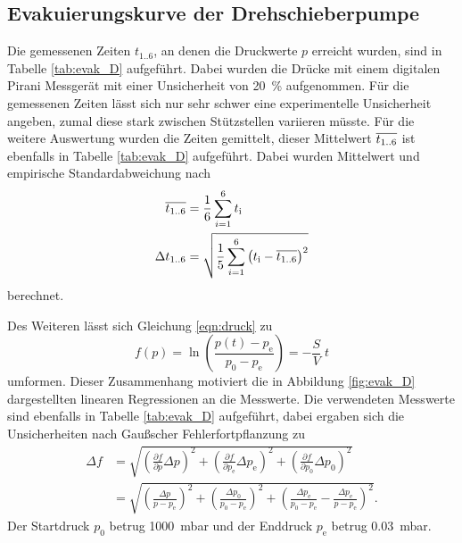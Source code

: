 \subsection{Evakuierungskurve der Drehschieberpumpe}
\label{sec:AuswEvaD}

Die gemessenen Zeiten $t_\text{1..6}$, an denen die Druckwerte $p$ erreicht
wurden, sind in Tabelle \ref{tab:evak_D} aufgeführt. Dabei wurden die Drücke
mit einem digitalen Pirani Messgerät mit einer
Unsicherheit von \SI{20}{\percent} aufgenommen. Für die gemessenen Zeiten lässt
sich nur sehr schwer eine experimentelle Unsicherheit angeben, zumal diese stark
zwischen Stützstellen variieren müsste. Für die weitere Auswertung wurden die
Zeiten gemittelt, dieser Mittelwert $\overline{t_\text{1..6}}$ ist ebenfalls in
Tabelle \ref{tab:evak_D} aufgeführt.
Dabei wurden Mittelwert und empirische Standardabweichung nach
\begin{align*}
  \overline{t_\text{1..6}} &= \frac{1}{6} \sum_{i = 1}^6 t_\text{i} \\
  \Delta t_\text{1..6} &=
  \sqrt{\frac{1}{5} \sum_{i = 1}^6 \left(t_\text{i} - \overline{t_\text{1..6}}\right)^2}
\end{align*}
berechnet.



Des Weiteren lässt sich Gleichung \eqref{eqn:druck} zu
\begin{equation*}
  f\left(p\right) = \ln\left(\frac{p(t)-p_\text{e}}{p_0-p_\text{e}}\right) =
  - \frac{S}{V} \;t
\end{equation*}
umformen. Dieser Zusammenhang motiviert die in Abbildung \ref{fig:evak_D}
dargestellten linearen Regressionen an die Messwerte. Die verwendeten Messwerte
sind ebenfalls in Tabelle \ref{tab:evak_D} aufgeführt, dabei ergaben sich die
Unsicherheiten nach Gaußscher Fehlerfortpflanzung zu
\begin{align*}
  \Delta f &=
  \sqrt{\left(\frac{\partial f}{\partial p} \Delta p\right)^2 +
  \left(\frac{\partial f}{\partial p_\text{e}} \Delta p_\text{e}\right)^2 +
  \left(\frac{\partial f}{\partial p_\text{0}} \Delta p_\text{0}\right)^2} \\
  &=
  \sqrt{\left(\frac{\Delta p}{p - p_\text{e}}\right)^2 +
  \left(\frac{\Delta p_0}{p_0 - p_\text{e}}\right)^2 +
  \left(\frac{\Delta p_\text{e}}{p_0 - p_\text{e}} -
  \frac{\Delta p_\text{e}}{p - p_\text{e}}\right)^2}.
\end{align*}
Der Startdruck $p_0$ betrug \SI{1000}{\milli\bar} und der Enddruck $p_\text{e}$
betrug \SI{0.03}{\milli\bar}.

